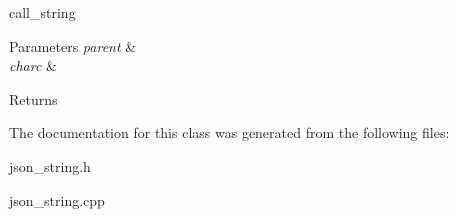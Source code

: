 call\+\_\+string 


\begin{DoxyParams}{Parameters}
{\em parent} & \\
\hline
{\em charc} & \\
\hline
\end{DoxyParams}
\begin{DoxyReturn}{Returns}

\end{DoxyReturn}


The documentation for this class was generated from the following files\+:\begin{DoxyCompactItemize}
\item 
json\+\_\+string.\+h\item 
json\+\_\+string.\+cpp\end{DoxyCompactItemize}
